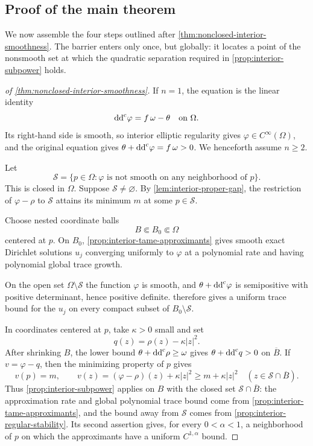 \subsection{Proof of the main theorem}\label{sec:interior-main-proof}

We now assemble the four steps outlined after \cref{thm:nonclosed-interior-smoothness}. The barrier enters only once, but globally: it locates a point of the nonsmooth set at which the quadratic separation required in \cref{prop:interior-subpower} holds.

\begin{proof}[of \cref{thm:nonclosed-interior-smoothness}]
If $n=1$, the equation is the linear identity
\[
  \mathrm{dd}^{\mathrm{c}}\varphi=f\,\omega-\theta
  \quad\text{on }\Omega.
\]
Its right-hand side is smooth, so interior elliptic regularity gives $\varphi\in C^\infty(\Omega)$, and the original equation gives $\theta+\mathrm{dd}^{\mathrm{c}}\varphi=f\,\omega>0$. We henceforth assume $n\geq2$.

Let
\[
  \mathcal S=\{p\in\Omega:\varphi\text{ is not smooth on any neighborhood of }p\}.
\]
This is closed in $\Omega$. Suppose $\mathcal S\neq\varnothing$. By \cref{lem:interior-proper-gap}, the restriction of $\varphi-\rho$ to $\mathcal S$ attains its minimum $m$ at some $p\in\mathcal S$.

Choose nested coordinate balls
\[
  B\Subset B_0\Subset\Omega
\]
centered at $p$. On $B_0$, \cref{prop:interior-tame-approximants} gives smooth exact Dirichlet solutions $u_j$ converging uniformly to $\varphi$ at a polynomial rate and having polynomial global trace growth.

On the open set $\Omega\setminus\mathcal S$ the function $\varphi$ is smooth, and $\theta+\mathrm{dd}^{\mathrm{c}}\varphi$ is semipositive with positive determinant, hence positive definite.  therefore gives a uniform trace bound for the $u_j$ on every compact subset of $B_0\setminus\mathcal S$.

In coordinates centered at $p$, take $\kappa>0$ small and set
\[
  q(z)=\rho(z)-\kappa|z|^2.
\]
After shrinking $B$, the lower bound $\theta+\mathrm{dd}^{\mathrm{c}}\rho\geq\omega$ gives $\theta+\mathrm{dd}^{\mathrm{c}} q>0$ on $\overline B$. If $v=\varphi-q$, then the minimizing property of $p$ gives
\[
  v(p)=m,
  \qquad
  v(z)=(\varphi-\rho)(z)+\kappa|z|^2
  \geq m+\kappa|z|^2
  \quad(z\in\mathcal S\cap\overline B).
\]
Thus \cref{prop:interior-subpower} applies on $B$ with the closed set $\mathcal S\cap\overline B$: the approximation rate and global polynomial trace bound come from \cref{prop:interior-tame-approximants}, and the bound away from $\mathcal S$ comes from \cref{prop:interior-regular-stability}. Its second assertion gives, for every $0<\alpha<1$, a neighborhood of $p$ on which the approximants have a uniform $C^{1,\alpha}$ bound.


\end{proof}
